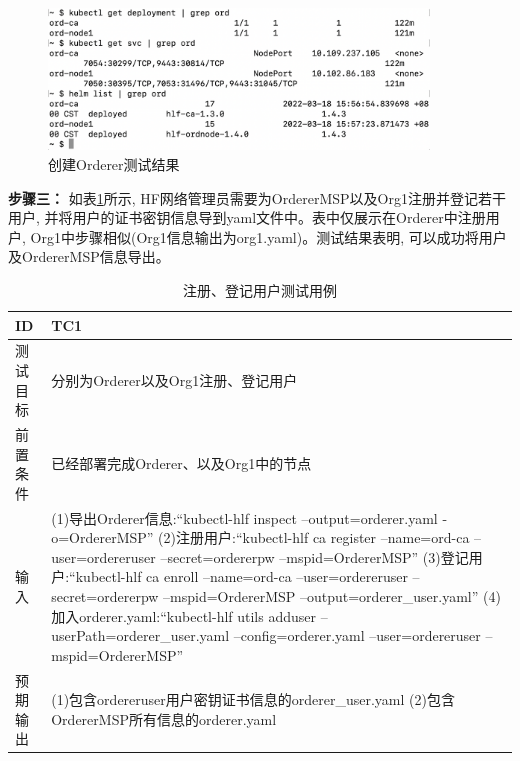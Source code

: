 \begin{figure}[h] %
    \centering %
    \includegraphics[width=0.9\textwidth]{FIGs/chapter5/orderer.png} %
    \caption{创建Orderer测试结果} %
    \label{testcase2result} %
\end{figure}%

\textbf{步骤三：} 如表\ref{reg_enroll_test}所示, HF网络管理员需要为OrdererMSP以及Org1注册并登记若干用户, 并将用户的证书密钥信息导到yaml文件中。表中仅展示在Orderer中注册用户, Org1中步骤相似(Org1信息输出为org1.yaml)。测试结果表明, 可以成功将用户及OrdererMSP信息导出。

\newpage

{\footnotesize
\begin{longtable}[h]{m{40pt}|m{300pt}}
    \caption[注册、登记用户测试用例]{注册、登记用户测试用例} \label{reg_enroll_test}\\
        \hline  
        ID&TC1\\
        \hline
        测试目标&分别为Orderer以及Org1注册、登记用户\\
        \hline
        前置条件&已经部署完成Orderer、以及Org1中的节点\\
        \hline
        输入& (1)导出Orderer信息:“kubectl-hlf inspect --output=orderer.yaml -o=OrdererMSP”
        \newline (2)注册用户:“kubectl-hlf ca register --name=ord-ca --user=ordereruser --secret=ordererpw --mspid=OrdererMSP”
        \newline (3)登记用户:“kubectl-hlf ca enroll --name=ord-ca --user=ordereruser --secret=ordererpw --mspid=OrdererMSP --output=orderer\_user.yaml”
        \newline (4)加入orderer.yaml:“kubectl-hlf utils adduser --userPath=orderer\_user.yaml --config=orderer.yaml --user=ordereruser --mspid=OrdererMSP”\\

        \hline 
        预期输出& (1)包含ordereruser用户密钥证书信息的orderer\_user.yaml
        \newline (2)包含OrdererMSP所有信息的orderer.yaml\\
        \hline
    \end{longtable} 
}


